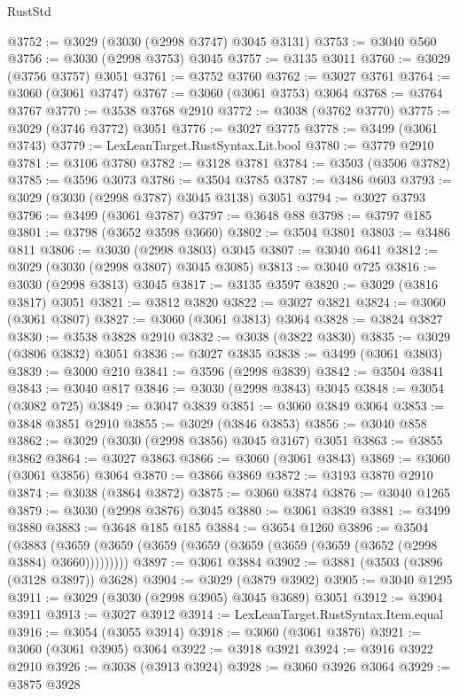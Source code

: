 \begin{lexlean}{RustStd}
\begin{coremodule}
@3752 := @3029 (@3030 (@2998 @3747) @3045 @3131)
@3753 := @3040 @560
@3756 := @3030 (@2998 @3753) @3045
@3757 := @3135 @3011
@3760 := @3029 (@3756 @3757) @3051
@3761 := @3752 @3760
@3762 := @3027 @3761
@3764 := @3060 (@3061 @3747)
@3767 := @3060 (@3061 @3753) @3064
@3768 := @3764 @3767
@3770 := @3538 @3768 @2910
@3772 := @3038 (@3762 @3770)
@3775 := @3029 (@3746 @3772) @3051
@3776 := @3027 @3775
@3778 := @3499 (@3061 @3743)
@3779 := LexLeanTarget.RustSyntax.Lit.bool
@3780 := @3779 @2910
@3781 := @3106 @3780
@3782 := @3128 @3781
@3784 := @3503 (@3506 @3782)
@3785 := @3596 @3073
@3786 := @3504 @3785
@3787 := @3486 @603
@3793 := @3029 (@3030 (@2998 @3787) @3045 @3138) @3051
@3794 := @3027 @3793
@3796 := @3499 (@3061 @3787)
@3797 := @3648 @88
@3798 := @3797 @185
@3801 := @3798 (@3652 @3598 @3660)
@3802 := @3504 @3801
@3803 := @3486 @811
@3806 := @3030 (@2998 @3803) @3045
@3807 := @3040 @641
@3812 := @3029 (@3030 (@2998 @3807) @3045 @3085)
@3813 := @3040 @725
@3816 := @3030 (@2998 @3813) @3045
@3817 := @3135 @3597
@3820 := @3029 (@3816 @3817) @3051
@3821 := @3812 @3820
@3822 := @3027 @3821
@3824 := @3060 (@3061 @3807)
@3827 := @3060 (@3061 @3813) @3064
@3828 := @3824 @3827
@3830 := @3538 @3828 @2910
@3832 := @3038 (@3822 @3830)
@3835 := @3029 (@3806 @3832) @3051
@3836 := @3027 @3835
@3838 := @3499 (@3061 @3803)
@3839 := @3000 @210
@3841 := @3596 (@2998 @3839)
@3842 := @3504 @3841
@3843 := @3040 @817
@3846 := @3030 (@2998 @3843) @3045
@3848 := @3054 (@3082 @725)
@3849 := @3047 @3839
@3851 := @3060 @3849 @3064
@3853 := @3848 @3851 @2910
@3855 := @3029 (@3846 @3853)
@3856 := @3040 @858
@3862 := @3029 (@3030 (@2998 @3856) @3045 @3167) @3051
@3863 := @3855 @3862
@3864 := @3027 @3863
@3866 := @3060 (@3061 @3843)
@3869 := @3060 (@3061 @3856) @3064
@3870 := @3866 @3869
@3872 := @3193 @3870 @2910
@3874 := @3038 (@3864 @3872)
@3875 := @3060 @3874
@3876 := @3040 @1265
@3879 := @3030 (@2998 @3876) @3045
@3880 := @3061 @3839
@3881 := @3499 @3880
@3883 := @3648 @185 @185
@3884 := @3654 @1260
@3896 := @3504
    (@3883 (@3659 (@3659 (@3659 (@3659 (@3659 (@3659 (@3659 (@3652 (@2998 @3884) @3660)))))))))
@3897 := @3061 @3884
@3902 := @3881 (@3503 (@3896 (@3128 @3897)) @3628)
@3904 := @3029 (@3879 @3902)
@3905 := @3040 @1295
@3911 := @3029 (@3030 (@2998 @3905) @3045 @3689) @3051
@3912 := @3904 @3911
@3913 := @3027 @3912
@3914 := LexLeanTarget.RustSyntax.Item.equal
@3916 := @3054 (@3055 @3914)
@3918 := @3060 (@3061 @3876)
@3921 := @3060 (@3061 @3905) @3064
@3922 := @3918 @3921
@3924 := @3916 @3922 @2910
@3926 := @3038 (@3913 @3924)
@3928 := @3060 @3926 @3064
@3929 := @3875 @3928

\end{coremodule}
\end{lexlean}
